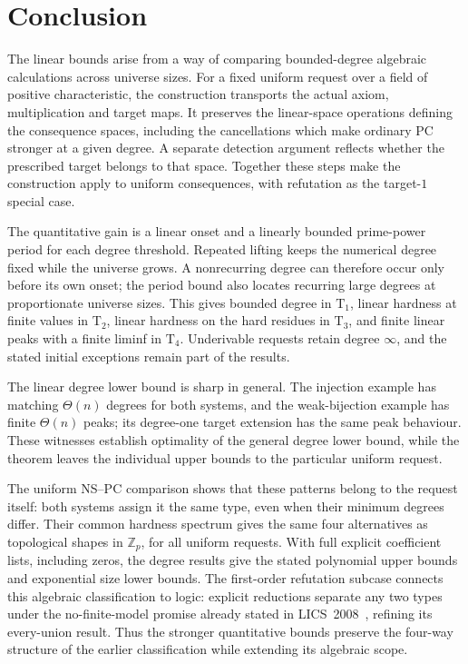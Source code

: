 \section{Conclusion}\label{sec:conclusion}
The linear bounds arise from a way of comparing bounded-degree algebraic
calculations across universe sizes. For a fixed uniform request over a
field of positive characteristic, the construction transports the actual
axiom, multiplication and target maps. It preserves the linear-space
operations defining the consequence spaces, including the cancellations
which make ordinary PC stronger at a given degree. A separate detection
argument reflects whether the prescribed target belongs to that space.
Together these steps make the construction apply to uniform consequences,
with refutation as the target-$1$ special case.

The quantitative gain is a linear onset and a linearly bounded prime-power
period for each degree threshold. Repeated lifting keeps the numerical
degree fixed while the universe grows. A nonrecurring degree can therefore
occur only before its own onset; the period bound also locates recurring
large degrees at proportionate universe sizes. This gives bounded degree
in $\mathrm T_1$, linear hardness at finite values in $\mathrm T_2$, linear
hardness on the hard residues in $\mathrm T_3$, and finite linear peaks
with a finite liminf in $\mathrm T_4$. Underivable requests retain degree
$\infty$, and the stated initial exceptions remain part of the results.

The linear degree lower bound is sharp in general. The injection example has matching
$\Theta(n)$ degrees for both systems, and the weak-bijection example has
finite $\Theta(n)$ peaks; its degree-one target extension has the same
peak behaviour. These witnesses establish optimality of the general
degree lower bound, while the theorem leaves the individual upper bounds to the
particular uniform request.

The uniform NS--PC comparison shows that these patterns belong to the
request itself: both systems assign it the same type, even when their
minimum degrees differ. Their common hardness spectrum gives the same
four alternatives as topological shapes in $\mathbb Z_p$, for all
uniform requests. With full explicit coefficient lists, including
zeros, the degree results give the stated polynomial upper bounds and
exponential size lower bounds. The first-order refutation subcase connects
this algebraic classification to logic: explicit reductions separate
any two types under the no-finite-model promise already stated in
LICS~2008~\cite[Theorem~1]{Riis}, refining its every-union result.
Thus the stronger quantitative bounds preserve the four-way
structure of the earlier classification while extending its algebraic
scope.

